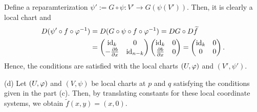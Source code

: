 \documentclass{../note}
\begin{document}
\begin{pf}
Define a reparamterization $\psi':=G\circ\psi:V'\to G(\psi(V'))$.
Then, it is clearly a local chart and
\begin{align*}
D(\psi'\circ f\circ\f^{-1})
&=D(G\circ\psi\circ f\circ\f^{-1})
=DG\circ D\tilde f\\
&=\mat{\id_k&0\\-\pd{b}{x}&\id_{n-k}}\mat{\id_k&0\\\pd{b}{x}&0}
=\mat{\id_k&0\\0&0}.
\end{align*}
Hence, the conditions are satisfied with the local charts $(U,\varphi)$ and $(V',\psi')$.

(d)
Let $(U,\varphi)$ and $(V,\psi)$ be local charts at $p$ and $q$ satisfying the conditions given in the part (c).
Then, by translating constants for these local coordinate systems, we obtain $\tilde f(x,y)=(x,0)$.
\end{pf}
\end{document}
